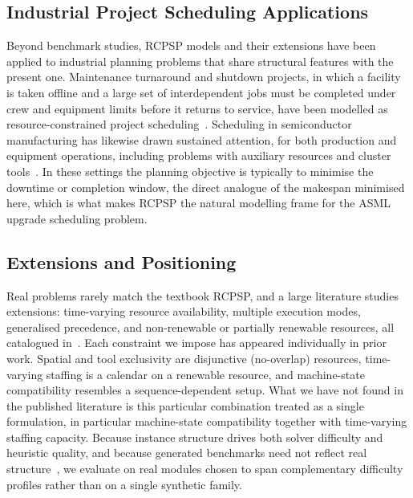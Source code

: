 \documentclass[conference]{IEEEtran}
\begin{document}
\subsection{Industrial Project Scheduling Applications}

Beyond benchmark studies, RCPSP models and their extensions have been
applied to industrial planning problems that share structural features
with the present one. Maintenance turnaround and shutdown projects, in
which a facility is taken offline and a large set of interdependent jobs
must be completed under crew and equipment limits before it returns to
service, have been modelled as resource-constrained project
scheduling~\cite{megow2011turnaround}. Scheduling in
semiconductor manufacturing has likewise drawn sustained attention, for
both production and equipment operations, including problems with
auxiliary resources and cluster tools~\cite{monch2011semiconductor}.
In these settings the planning objective is typically to minimise the
downtime or completion window, the direct analogue of the makespan
minimised here, which is what makes RCPSP the natural modelling frame
for the ASML upgrade scheduling problem.

\subsection{Extensions and Positioning}

Real problems rarely match the textbook RCPSP, and a large literature
studies extensions: time-varying resource availability, multiple
execution modes, generalised precedence, and non-renewable or
partially renewable resources, all catalogued
in~\cite{hartmann2010survey}. Each constraint we impose has appeared
individually in prior work. Spatial and tool exclusivity are
disjunctive (no-overlap) resources, time-varying staffing is a calendar
on a renewable resource, and machine-state compatibility resembles a
sequence-dependent setup. What we have not found in the published
literature is this particular combination treated as a single
formulation, in particular machine-state compatibility together with
time-varying staffing capacity. Because instance structure drives both
solver difficulty and heuristic quality, and because generated
benchmarks need not reflect real structure~\cite{vanhoucke2008measurement},
we evaluate on real modules chosen to span complementary difficulty
profiles rather than on a single synthetic family.

\end{document}
